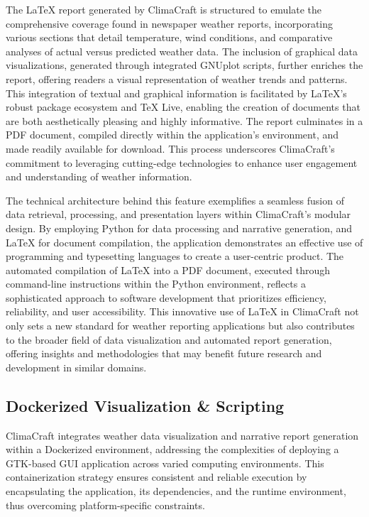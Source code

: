 \documentclass[sn-mathphys-num]{sn-jnl}%
\begin{document}
The LaTeX report generated by ClimaCraft is structured to emulate the comprehensive coverage found in newspaper weather reports, incorporating various sections that detail temperature, wind conditions, and comparative analyses of actual versus predicted weather data. The inclusion of graphical data visualizations, generated through integrated GNUplot scripts, further enriches the report, offering readers a visual representation of weather trends and patterns. This integration of textual and graphical information is facilitated by LaTeX's robust package ecosystem and TeX Live, enabling the creation of documents that are both aesthetically pleasing and highly informative. The report culminates in a PDF document, compiled directly within the application's environment, and made readily available for download. This process underscores ClimaCraft's commitment to leveraging cutting-edge technologies to enhance user engagement and understanding of weather information.

The technical architecture behind this feature exemplifies a seamless fusion of data retrieval, processing, and presentation layers within ClimaCraft's modular design. By employing Python for data processing and narrative generation, and LaTeX for document compilation, the application demonstrates an effective use of programming and typesetting languages to create a user-centric product. The automated compilation of LaTeX into a PDF document, executed through command-line instructions within the Python environment, reflects a sophisticated approach to software development that prioritizes efficiency, reliability, and user accessibility. This innovative use of LaTeX in ClimaCraft not only sets a new standard for weather reporting applications but also contributes to the broader field of data visualization and automated report generation, offering insights and methodologies that may benefit future research and development in similar domains.

\subsection{Dockerized Visualization \& Scripting}\label{sec3.5}

ClimaCraft integrates weather data visualization and narrative report generation within a Dockerized environment, addressing the complexities of deploying a GTK-based GUI application across varied computing environments. This containerization strategy ensures consistent and reliable execution by encapsulating the application, its dependencies, and the runtime environment, thus overcoming platform-specific constraints.
\end{document}
